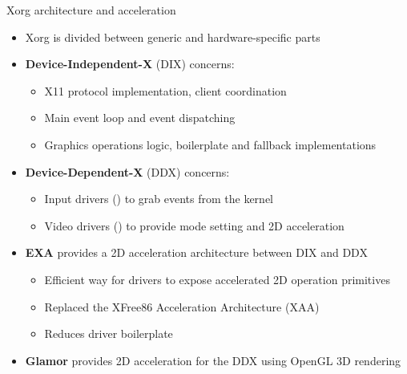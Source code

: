 \begin{frame}{Xorg architecture and acceleration}
  \begin{itemize}
  \item Xorg is divided between generic and hardware-specific parts
  \item \textbf{Device-Independent-X} (DIX) concerns:
    \begin{itemize}
    \item X11 protocol implementation, client coordination
    \item Main event loop and event dispatching
    \item Graphics operations logic, boilerplate and fallback implementations
    \end{itemize}
  \item \textbf{Device-Dependent-X} (DDX) concerns:
    \begin{itemize}
    \item Input drivers () to grab events from the kernel
    \item Video drivers () to provide mode setting and 2D acceleration
    \end{itemize}
  \item \textbf{EXA} provides a 2D acceleration architecture between DIX and DDX
    \begin{itemize}
    \item Efficient way for drivers to expose accelerated 2D operation primitives
    \item Replaced the XFree86 Acceleration Architecture (XAA)
    \item Reduces driver boilerplate
    \end{itemize}
  \item \textbf{Glamor} provides 2D acceleration for the DDX using OpenGL 3D rendering
  \end{itemize}
\end{frame}

